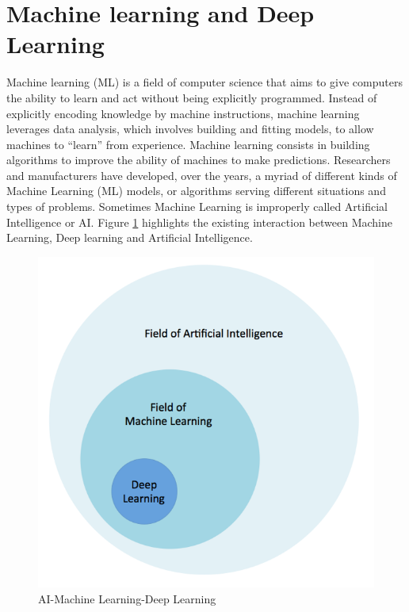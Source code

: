\section{Machine learning and Deep Learning} \label{Machine learning and Deep Learning}

Machine learning (ML) is a field of computer science that aims to give computers the ability to learn and act without being explicitly programmed. Instead of explicitly encoding knowledge by machine instructions, machine learning leverages data analysis, which involves building and fitting models, to allow machines to ``learn'' from experience. Machine learning consists in building algorithms to improve the ability of machines to make predictions. Researchers and manufacturers have developed, over the years, a myriad of different kinds of Machine Learning (ML) models, or algorithms serving different situations and types of problems. Sometimes Machine Learning is improperly called Artificial Intelligence or AI. Figure \ref{fig:ai_ml_dl} highlights the existing interaction between Machine Learning, Deep learning and Artificial Intelligence.

\begin{figure}
\centerline{\includegraphics[scale=0.8]{images/chapter_2/AI_ML_DL.png}}
\caption{AI-Machine Learning-Deep Learning}
\label{fig:ai_ml_dl}
\end{figure}

